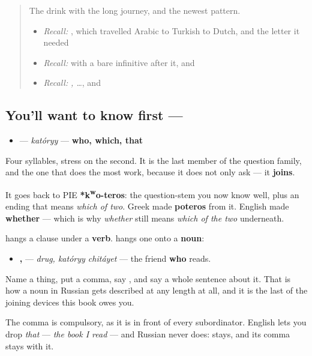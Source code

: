 \label{lesson:RU-C22-kotoryy}



\begin{quote}
The drink with the long journey, and the newest pattern.

\begin{itemize}
\raggedright
  \item \emph{Recall:} \emph{}, which travelled Arabic to Turkish to Dutch, and the letter \textbf{} it needed
  \item \emph{Recall:} \emph{ } with a bare infinitive after it, and \emph{}
  \item \emph{Recall:} \emph{  ,  …}, and \emph{ }
\end{itemize}
\end{quote}

\subsection*{You'll want to know first — }
\begin{itemize}
\raggedright
  \item \textbf{} — \emph{katóryy} — \textbf{who, which, that}
\end{itemize}

Four syllables, stress on the second. It is the last member of the question family, and the one that does the most work, because it does not only ask — it \textbf{joins}.

It goes back to PIE \textbf{*k\textsuperscript{w}o-teros}: the question-stem you now know well, plus an ending that means \emph{which of two}. Greek made \textbf{poteros} from it. English made \textbf{whether} — which is why \emph{whether} still means \emph{which of the two} underneath.

\begin{grammarlens}[title={Grammar lens — a whole clause, stuck onto a noun}]
\textbf{} hangs a clause under a \textbf{verb}. \textbf{} hangs one onto a \textbf{noun}:

\begin{itemize}
\raggedright
  \item \textbf{,  } — \emph{drug, katóryy chitáyet} — the friend \textbf{who} reads.
\end{itemize}

Name a thing, put a comma, say \textbf{}, and say a whole sentence about it. That is how a noun in Russian gets described at any length at all, and it is the last of the joining devices this book owes you.

The comma is compulsory, as it is in front of every subordinator. English lets you drop \emph{that} — \emph{the book I read} — and Russian never does: \textbf{} stays, and its comma stays with it.
\end{grammarlens}

